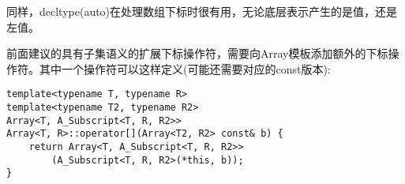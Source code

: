 同样，decltype(auto)在处理数组下标时很有用，无论底层表示产生的是值，还是左值。

前面建议的具有子集语义的扩展下标操作符，需要向Array模板添加额外的下标操作符。其中一个操作符可以这样定义(可能还需要对应的const版本):

\begin{lstlisting}[style=styleCXX]
template<typename T, typename R>
template<typename T2, typename R2>
Array<T, A_Subscript<T, R, R2>>
Array<T, R>::operator[](Array<T2, R2> const& b) {
	return Array<T, A_Subscript<T, R, R2>>
		(A_Subscript<T, R, R2>(*this, b));
}
\end{lstlisting}













